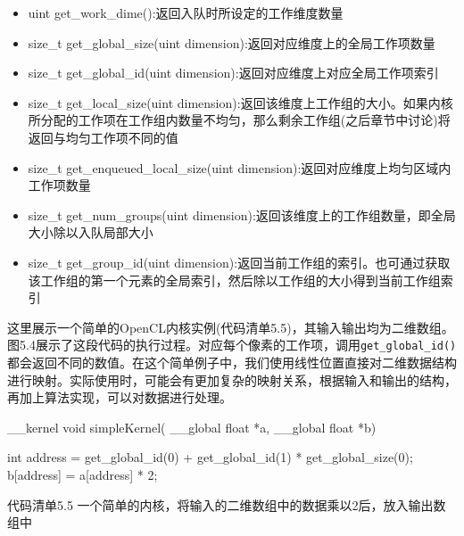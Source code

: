 \begin{itemize}
\item uint get\_\allowbreak{}work\_\allowbreak{}dime():返回入队时所设定的工作维度数量
\item size\_\allowbreak{}t get\_\allowbreak{}global\_\allowbreak{}size(uint dimension):返回对应维度上的全局工作项数量
\item size\_\allowbreak{}t get\_\allowbreak{}global\_\allowbreak{}id(uint dimension):返回对应维度上对应全局工作项索引
\item size\_\allowbreak{}t get\_\allowbreak{}local\_\allowbreak{}size(uint dimension):返回该维度上工作组的大小。如果内核所分配的工作项在工作组内数量不均匀，那么剩余工作组(之后章节中讨论)将返回与均匀工作项不同的值
\item size\_\allowbreak{}t get\_\allowbreak{}enqueued\_\allowbreak{}local\_\allowbreak{}size(uint dimension):返回对应维度上均匀区域内工作项数量
\item size\_\allowbreak{}t get\_\allowbreak{}num\_\allowbreak{}groups(uint dimension):返回该维度上的工作组数量，即全局大小除以入队局部大小
\item size\_\allowbreak{}t get\_\allowbreak{}group\_\allowbreak{}id(uint dimension):返回当前工作组的索引。也可通过获取该工作组的第一个元素的全局索引，然后除以工作组的大小得到当前工作组索引
\end{itemize}

这里展示一个简单的OpenCL内核实例(代码清单5.5)，其输入输出均为二维数组。图5.4展示了这段代码的执行过程。对应每个像素的工作项，调用\texttt{get\_global\_id()}都会返回不同的数值。在这个简单例子中，我们使用线性位置直接对二维数据结构进行映射。实际使用时，可能会有更加复杂的映射关系，根据输入和输出的结构，再加上算法实现，可以对数据进行处理。

\begin{codebox}[cpp]
__kernel void simpleKernel(
  __global float *a,
  __global float *b){

  int address = get_global_id(0) + get_global_id(1) * get_global_size(0);
  b[address] = a[address] * 2;
}
\end{codebox}

代码清单5.5 一个简单的内核，将输入的二维数组中的数据乘以2后，放入输出数组中


